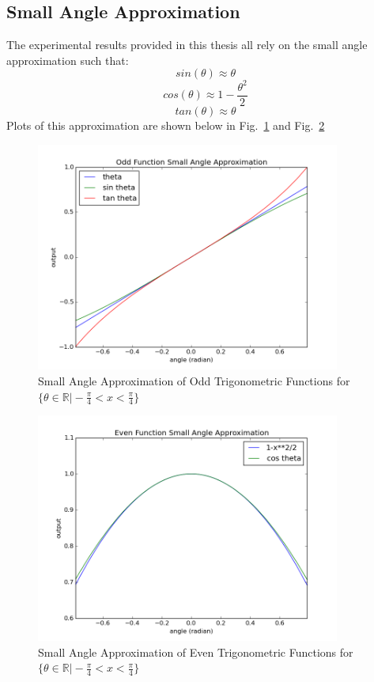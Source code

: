 \documentclass[12pt,a4paper]{book}
\begin{document}
\subsection{Small Angle Approximation}
The experimental results provided in this thesis all rely on the small angle approximation such that:
\begin{equation}
sin(\theta) \approx \theta
\end{equation}
\begin{equation}
cos(\theta) \approx 1 - \frac{\theta^{2}}{2}
\end{equation}
\begin{equation}
tan(\theta) \approx \theta
\end{equation}
Plots of this approximation are shown below in Fig.~\ref{f:smallAngle} and Fig.~\ref{f:smallAngleO}
\begin{figure}[!ht]%
\centering
 \includegraphics[width=10cm]{smallAngle.png}
 \caption{Small Angle Approximation of Odd Trigonometric Functions for $\{\theta \in \mathbb{R} \vert -\frac{\pi}{4} < x < \frac{\pi}{4}\}$}
\label{f:smallAngle}
\end{figure} 
\begin{figure}[!ht]%
\centering
 \includegraphics[width=10cm]{smallAngleO.png}
 \caption{Small Angle Approximation of Even Trigonometric Functions for $\{\theta \in \mathbb{R} \vert -\frac{\pi}{4} < x < \frac{\pi}{4}\}$}
\label{f:smallAngleO}
\end{figure} 
\end{document}
